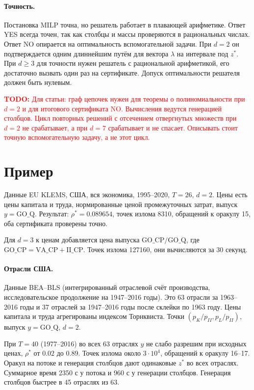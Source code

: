 \documentclass[a4paper,11pt]{article}
\theoremstyle{plain}
\theoremstyle{definition}
\theoremstyle{remark}
\newcommand{\todo}[1]{\textcolor{red}{\textbf{TODO:} #1}}
\begin{document}
\paragraph{Точность.} Постановка MILP точна, но решатель работает в плавающей арифметике. Ответ YES всегда точен, так как столбцы и массы проверяются в рациональных числах. Ответ NO опирается на оптимальность вспомогательной задачи. При $d=2$ он подтверждается одним длиннейшим путём для вектора $\lambda$ на интервале под $z^*$. При $d\ge3$ для точности нужен решатель с рациональной арифметикой, его достаточно вызвать один раз на сертификате. Допуск оптимальности решателя должен быть нулевым.

\todo{Для статьи: граф цепочек нужен для теоремы о полиномиальности при $d=2$ и для итогового сертификата NO. Вычисления ведутся генерацией столбцов. Цикл повторных решений с отсечением отвергнутых множеств при $d=2$ не срабатывает, а при $d=7$ срабатывает и не спасает. Описывать стоит точную вспомогательную задачу, а не этот цикл.}

\section{Пример}

Данные EU KLEMS, США, вся экономика, 1995--2020, $T=26$, $d=2$. Цены есть цены капитала и труда, нормированные ценой промежуточных затрат, выпуск $y=\mathrm{GO\_Q}$. Результат: $\rho^*=0.089654$, точек излома 8310, обращений к оракулу 15, оба сертификата проверены точно.

Для $d=3$ к ценам добавляется цена выпуска $\mathrm{GO\_CP}/\mathrm{GO\_Q}$, где $\mathrm{GO\_CP}=\mathrm{VA\_CP}+\mathrm{II\_CP}$. Точек излома 127160, они вычисляются за 30 секунд.

\paragraph{Отрасли США.} Данные BEA--BLS (интегрированный отраслевой счёт производства, исследовательское продолжение на 1947--2016 годы). Это 63 отрасли за 1963--2016 годы и 37 отраслей за 1947--2016 годы после склейки по 1963 году. Цены капитала и труда агрегированы индексом Торнквиста. Точки $(p_K/p_{II},p_L/p_{II})$, выпуск $y=\mathrm{GO\_Q}$, $d=2$.

При $T=40$ (1977--2016) во всех 63 отраслях $y$ не слабо разрешим при исходных ценах, $\rho^*$ от $0.02$ до $0.89$. Точек излома около $3\cdot10^4$, обращений к оракулу 16--17. Оракул на потоке и генерация столбцов дают одинаковые $z^*$ во всех отраслях. Суммарное время 2350 с у потока и 960 с у генерации столбцов. Генерация столбцов быстрее в 45 отраслях из 63.
\end{document}
